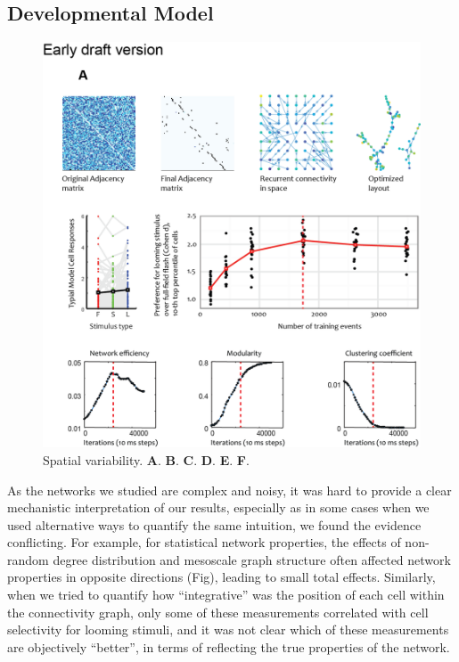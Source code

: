 \documentclass{article}
\begin{document}
\subsection*{Developmental Model}

\begin{figure}[t!]
\includegraphics[width=\linewidth]{fig6.png}
\caption{
Spatial variability. \textbf{A}. \textbf{B}. \textbf{C}. \textbf{D}. \textbf{E}. \textbf{F}. }
\end{figure}

As the networks we studied are complex and noisy, it was hard to provide a clear mechanistic interpretation of our results, especially as in some cases when we used alternative ways to quantify the same intuition, we found the evidence conflicting. For example, for statistical network properties, the effects of non-random degree distribution and mesoscale graph structure often affected network properties in opposite directions (Fig), leading to small total effects. Similarly, when we tried to quantify how “integrative” was the position of each cell within the connectivity graph, only some of these measurements correlated with cell selectivity for looming stimuli, and it was not clear which of these measurements are objectively “better”, in terms of reflecting the true properties of the network.
\end{document}
